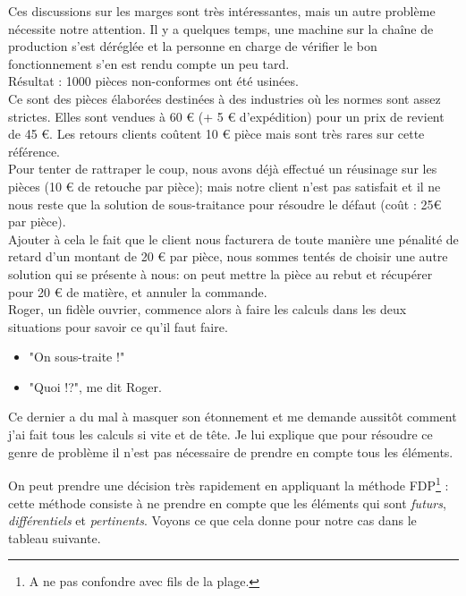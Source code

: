 Ces discussions sur les marges sont très intéressantes, mais un 
autre problème nécessite notre attention.
Il y a quelques temps, une machine sur la chaîne de 
production s'est déréglée et la personne en charge de 
vérifier le bon fonctionnement s'en est rendu compte 
un peu tard. \\
\hspace*{\parindent}Résultat : 1000 pièces non-conformes ont été usinées. \\
\hspace*{\parindent}Ce sont des pièces élaborées destinées à des industries où 
les normes sont assez strictes. 
Elles sont vendues à 60 \euro\/ 
(+ 5 \euro\/ d'expédition) pour un prix de revient de 45 \euro.
Les retours clients coûtent 10 \euro\/ pièce mais sont très rares 
sur cette référence. \\
\hspace*{\parindent}Pour tenter de rattraper le coup, nous avons déjà effectué 
un réusinage sur les pièces (10 \euro\/ de retouche par pièce); 
mais notre client n'est pas satisfait et il ne nous reste que 
la solution de sous-traitance pour résoudre le défaut 
(coût : 25\euro\/ par pièce). \\
\hspace*{\parindent}Ajouter à cela le fait que le client nous facturera de toute manière 
une pénalité de retard d'un montant de 20 \euro\/ par pièce, 
nous sommes tentés de choisir
une autre solution qui se présente à nous: on peut mettre la pièce 
au rebut et récupérer pour 20 \euro\/ de matière, et 
annuler la commande. \\
\hspace*{\parindent}Roger, un fidèle ouvrier, commence alors à faire les calculs 
dans les deux situations pour savoir ce qu'il faut faire.
\begin{itemize}
 \item "On sous-traite !"
 \item "Quoi !?", me dit Roger.
\end{itemize} 
Ce dernier a du mal à masquer son étonnement et me demande 
aussitôt comment j'ai fait tous les calculs si vite et de tête.
Je lui explique que pour résoudre ce genre de problème il n'est 
pas nécessaire de prendre en compte tous les éléments. 

On peut prendre une décision très rapidement en appliquant 
la méthode FDP\footnote{A ne pas confondre avec fils 
de la plage.} : cette méthode consiste à ne prendre en 
compte que les éléments qui sont \emph{futurs}, \emph{différentiels} 
et \emph{pertinents}. 
Voyons ce que cela donne pour notre cas dans le tableau suivante.

